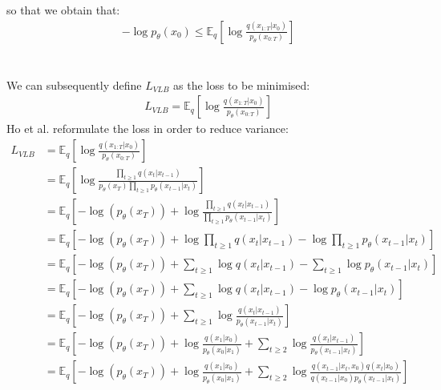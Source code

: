 \documentclass[twoside]{article}
\numberwithin{equation}{section}
\numberwithin{figure}{section}
\begin{document}
so that we obtain that:
\begin{align}
  - \log p_{\theta}\left(x_0\right) \leq \mathbb{E}_q \left[\log \frac{q\left(x_{1:T}|x_0\right)}{p_{\theta}\left(x_{0:T}\right)}\right]
\end{align}
\\\\
We can subsequently define $L_{VLB}$ as the loss to be minimised:
\begin{gather}
  L_{VLB} = \mathbb{E}_q \left[\log \frac{q\left(x_{1:T}|x_0\right)}{p_{\theta}\left(x_{0:T}\right)}\right] 
\end{gather}
Ho et al. \cite{ho2020denoising} reformulate the loss in order to reduce variance:
\begin{align}
  L_{VLB} &= \mathbb{E}_q \left[\log \frac{q\left(x_{1:T}|x_0\right)}{p_{\theta}\left(x_{0:T}\right)}\right] \\
  &= \mathbb{E}_q \left[\log \frac{\prod_{t \geq 1} q\left(x_t | x_{t-1}\right)}{p_{\theta} \left(x_T\right) \prod_{t \geq 1} p_{\theta}\left(x_{t-1} | x_t\right)}\right] \\
  &= \mathbb{E}_q \left[-\log\left(p_{\theta}\left(x_T\right)\right) + \log \frac{\prod_{t \geq 1} q\left(x_t | x_{t-1}\right)}{\prod_{t \geq 1} p_{\theta}\left(x_{t-1} | x_t\right)}\right] \\
  &= \mathbb{E}_q \left[-\log\left(p_{\theta}\left(x_T\right)\right) + \log \prod_{t \geq 1} q\left(x_t | x_{t-1}\right) - \log \prod_{t \geq 1} p_{\theta}\left(x_{t-1} | x_t\right)\right] \\
  &= \mathbb{E}_q \left[-\log\left(p_{\theta}\left(x_T\right)\right) + \sum_{t \geq 1} \log q\left(x_t | x_{t-1}\right) - \sum_{t \geq 1} \log p_{\theta}\left(x_{t-1} | x_t\right)\right] \\
  &= \mathbb{E}_q \left[-\log\left(p_{\theta}\left(x_T\right)\right) + \sum_{t \geq 1} \log q\left(x_t | x_{t-1}\right) - \log p_{\theta}\left(x_{t-1} | x_t\right)\right] \\
  &= \mathbb{E}_q \left[-\log\left(p_{\theta}\left(x_T\right)\right) + \sum_{t \geq 1} \log \frac{q\left(x_t | x_{t-1}\right)}{p_{\theta}\left(x_{t-1} | x_t\right)}\right] \\
  &= \mathbb{E}_q \left[-\log\left(p_{\theta}\left(x_T\right)\right) + \log \frac{q\left(x_1 | x_0\right)}{p_{\theta}\left(x_0 | x_1\right)} + \sum_{t \geq 2} \log \frac{q\left(x_t | x_{t-1}\right)}{p_{\theta}\left(x_{t-1} | x_t\right)}\right] \\
  &= \mathbb{E}_q \left[-\log\left(p_{\theta}\left(x_T\right)\right) + \log \frac{q\left(x_1 | x_0\right)}{p_{\theta}\left(x_0 | x_1\right)} + \sum_{t \geq 2} \log \frac{q\left(x_{t-1} | x_t, x_0\right) q\left(x_t | x_0\right)}{{q\left(x_{t-1} | x_0\right)} p_{\theta}\left(x_{t-1} | x_t\right)}\right] \label{eq:conditionedq}\\

\end{align}
\end{document}
